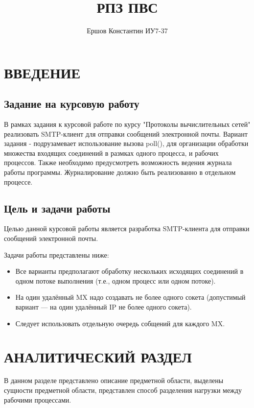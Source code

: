\documentclass[a4paper,12pt]{report}
\title{РПЗ ПВС}
\author{Ершов Константин ИУ7-37}
\begin{document}
\maketitle

\tableofcontents
\newpage
\section{ВВЕДЕНИЕ}

\subsection{Задание на курсовую работу}
В рамках задания к курсовой работе по курсу "Протоколы вычислительных сетей" реализовать SMTP-клиент для отправки сообщений электронной почты. Вариант задания -  подрузамевает использование вызова poll(), для организации обработки множества входящих соединений в размках одного процесса, и рабочих процессов. Также необходимо предусмотреть возможность ведения журнала работы программы. Журналирование должно быть реализованно в отдельном процессе.
\subsection{Цель и задачи работы} 
Целью данной курсовой работы является разработка SMTP-клиента для отправки сообщений электронной почты.

Задачи работы представлены ниже:
\begin{itemize}
	 SMTP-клиента (как части MTA), обеспечивающего удаленную доставку и поддерживающего очереди сообщений.

	\item Все варианты предполагают обработку нескольких исходящих соединений в одном потоке выполнения (т.е., одном процесс или одном потоке).

	\item На один удалённый MX надо создавать не более одного сокета (допустимый вариант — на один удалённый IP не более одного сокета).

	\item Следует использовать отдельную очередь собщений для каждого MX.		

\end{itemize}

\newpage
\section{АНАЛИТИЧЕСКИЙ РАЗДЕЛ}
В данном разделе представлено описание предметной области, выделены сущности предметной области, представлен способ разделения нагрузки между рабочими процессами.
\end{document}
